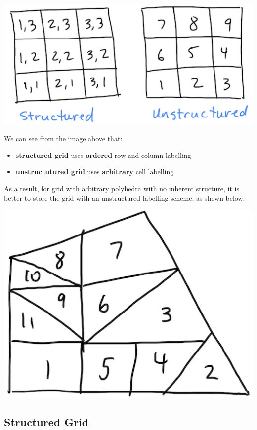 \documentclass[11pt]{article}
\begin{document}
\begin{center}
\includegraphics[scale=0.4]{../pic/grid.png}
\end{center}
We can see from the image above that:
\begin{itemize}
\item \textbf{structured grid} uses \textbf{ordered} row and column labelling
\item \textbf{unstructutured grid} uses \textbf{arbitrary} cell labelling
\end{itemize}
As a result, for grid with arbitrary polyhedra with no inherent structure, it is better to store
the grid with an unstructured labelling scheme, as shown below.
\begin{center}
\includegraphics[scale=0.4]{../pic/polyhedra_unstructured.png}
\end{center}
\subsection{Structured Grid}
\label{sec:org7b772cb}
\end{document}
